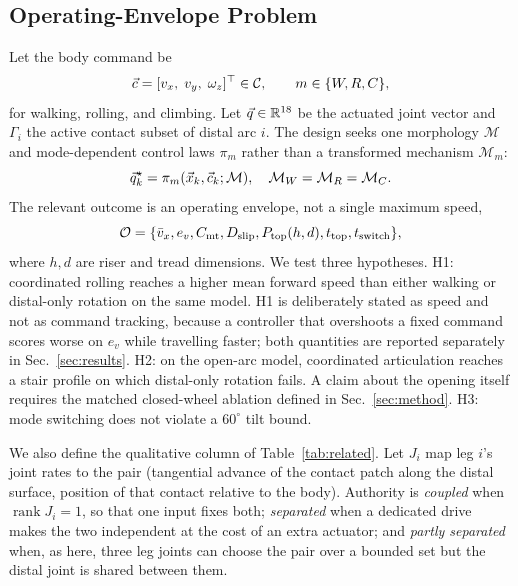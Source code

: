 \subsection{Operating-Envelope Problem}

Let the body command be
\begin{equation}
  \vec{c}=[v_x,\;v_y,\;\omega_z]^\top\in\mathcal{C},
  \qquad m\in\{W,R,C\},                                      \label{eq:command}
\end{equation}
for walking, rolling, and climbing. Let $\vec{q}\in\mathbb{R}^{18}$ be the actuated
joint vector and $\Gamma_i$ the active contact subset of distal arc $i$. The
design seeks one morphology $\mathcal{M}$ and mode-dependent control laws
$\pi_m$ rather than a transformed mechanism $\mathcal{M}_m$:
\begin{equation}
 \vec{q}^{\star}_{k}=\pi_m(\vec{x}_k,\vec{c}_k;\mathcal{M}),
 \quad \mathcal{M}_W=\mathcal{M}_R=\mathcal{M}_C.             \label{eq:reuse}
\end{equation}
The relevant outcome is an operating envelope, not a single maximum speed,
\begin{equation}
 \mathcal{O}=\{\bar v_x, e_v, C_{\rm mt},D_{\rm slip},
 P_{\rm top}(h,d),t_{\rm top},t_{\rm switch}\},              \label{eq:envelope}
\end{equation}
where $h,d$ are riser and tread dimensions. We test three hypotheses.
H1: coordinated rolling reaches a higher mean forward speed than either walking
or distal-only rotation on the same model. H1 is deliberately stated as speed and
not as command tracking, because a controller that overshoots a fixed command
scores worse on $e_v$ while travelling faster; both quantities are reported
separately in Sec.~\ref{sec:results}. H2: on the open-arc model, coordinated
articulation reaches a stair profile on which distal-only rotation fails. A
claim about the opening itself requires the matched closed-wheel ablation
defined in Sec.~\ref{sec:method}.
H3: mode switching does not violate a $60^\circ$ tilt bound.

We also define the qualitative column of Table~\ref{tab:related}. Let $J_i$ map
leg $i$'s joint rates to the pair (tangential advance of the contact patch along
the distal surface, position of that contact relative to the body). Authority is
\emph{coupled} when $\operatorname{rank}J_i=1$, so that one input fixes both;
\emph{separated} when a dedicated drive makes the two independent at the cost of
an extra actuator; and \emph{partly separated} when, as here, three leg joints
can choose the pair over a bounded set but the distal joint is shared between
them.


